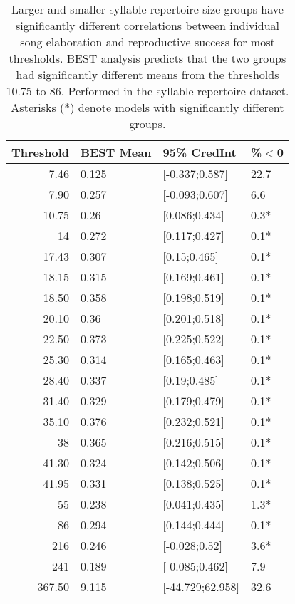 \documentclass{article}
\begin{document}
  
  \begin{table}[ht]
  \centering
  \caption{Larger and smaller syllable repertoire size groups have significantly different correlations between individual song elaboration and reproductive success for most thresholds.  BEST analysis predicts that the two  groups  had  significantly  different  means  from  the  thresholds  10.75  to  86.   Performed  in  the  syllable repertoire dataset.  Asterisks (*) denote models with significantly different groups.} 
  \begin{tabular}{rlll}
  \hline
  Threshold & BEST Mean & 95\% CredInt & \%$<$0 \\ 
  \hline
  7.46 & 0.125 & [-0.337;0.587] & 22.7 \\ 
  7.90 & 0.257 & [-0.093;0.607] & 6.6 \\ 
  10.75 & 0.26 & [0.086;0.434] & 0.3* \\ 
  14 & 0.272 & [0.117;0.427] & 0.1* \\ 
  17.43 & 0.307 & [0.15;0.465] & 0.1* \\ 
  18.15 & 0.315 & [0.169;0.461] & 0.1* \\ 
  18.50 & 0.358 & [0.198;0.519] & 0.1* \\ 
  20.10 & 0.36 & [0.201;0.518] & 0.1* \\ 
  22.50 & 0.373 & [0.225;0.522] & 0.1* \\ 
  25.30 & 0.314 & [0.165;0.463] & 0.1* \\ 
  28.40 & 0.337 & [0.19;0.485] & 0.1* \\ 
  31.40 & 0.329 & [0.179;0.479] & 0.1* \\ 
  35.10 & 0.376 & [0.232;0.521] & 0.1* \\ 
  38 & 0.365 & [0.216;0.515] & 0.1* \\ 
  41.30 & 0.324 & [0.142;0.506] & 0.1* \\ 
  41.95 & 0.331 & [0.138;0.525] & 0.1* \\ 
  55 & 0.238 & [0.041;0.435] & 1.3* \\ 
  86 & 0.294 & [0.144;0.444] & 0.1* \\ 
  216 & 0.246 & [-0.028;0.52] & 3.6* \\ 
  241 & 0.189 & [-0.085;0.462] & 7.9 \\ 
  367.50 & 9.115 & [-44.729;62.958] & 32.6 \\ 
  \hline
  \end{tabular}
  \end{table}
\end{document}
